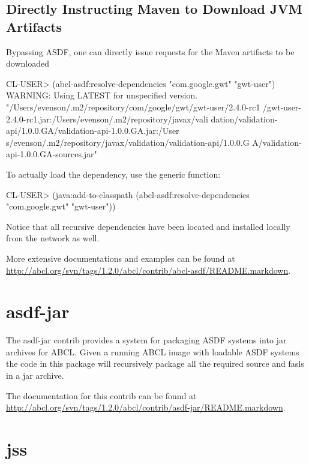 \documentclass[10pt]{book}
\begin{document}
\subsection{Directly Instructing Maven to Download JVM Artifacts}

Bypassing \textsc{ASDF}, one can directly issue requests for the Maven
artifacts to be downloaded

\begin{listing-lisp}
CL-USER> (abcl-asdf:resolve-dependencies "com.google.gwt"
                                         "gwt-user")
WARNING: Using LATEST for unspecified version.
"/Users/evenson/.m2/repository/com/google/gwt/gwt-user/2.4.0-rc1
/gwt-user-2.4.0-rc1.jar:/Users/evenson/.m2/repository/javax/vali
dation/validation-api/1.0.0.GA/validation-api-1.0.0.GA.jar:/User
s/evenson/.m2/repository/javax/validation/validation-api/1.0.0.G
A/validation-api-1.0.0.GA-sources.jar"
\end{listing-lisp}

To actually load the dependency, use the  generic
function:

\begin{listing-lisp}
CL-USER> (java:add-to-classpath
          (abcl-asdf:resolve-dependencies "com.google.gwt"
                                          "gwt-user"))
\end{listing-lisp}

Notice that all recursive dependencies have been located and installed
locally from the network as well.

More extensive documentations and examples can be found at
\url{http://abcl.org/svn/tags/1.2.0/abcl/contrib/abcl-asdf/README.markdown}.


\section{asdf-jar}

The asdf-jar contrib provides a system for packaging \textsc{ASDF}
systems into jar archives for \textsc{ABCL}.  Given a running
\textsc{ABCL} image with loadable \textsc{ASDF} systems the code in
this package will recursively package all the required source and
fasls in a jar archive.

The documentation for this contrib can be found at
\url{http://abcl.org/svn/tags/1.2.0/abcl/contrib/asdf-jar/README.markdown}.


\section{jss}
\label{section:jss}
\end{document}
